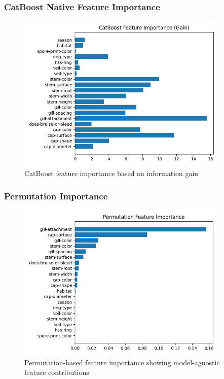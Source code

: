 \documentclass[11pt,a4paper]{article}
\begin{document}
\subsubsection{CatBoost Native Feature Importance}
\begin{figure}[H]
    \centering
    \includegraphics[width=0.9\textwidth]{figures/feat_imp_gain.png}
    \caption{CatBoost feature importance based on information gain}
    \label{fig:catboost_importance}
\end{figure}

\subsubsection{Permutation Importance}
\begin{figure}[H]
    \centering
    \includegraphics[width=0.9\textwidth]{figures/perm_importance.png}
    \caption{Permutation-based feature importance showing model-agnostic feature contributions}
    \label{fig:permutation_importance}
\end{figure}
\end{document}
